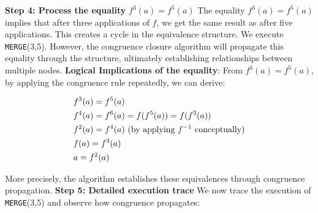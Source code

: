 \documentclass[a4paper]{article}
\theoremstyle{definition}
\begin{document}
\textbf{Step 4: Process the equality} \( f^3(a) = f^5(a) \)   
\vspace{1em}
\noindent
\newline
The equality \( f^3(a) = f^5(a) \) implies that after three applications of \( f \), we get the same result as after 
five applications. This creates a cycle in the equivalence structure.
\vspace{1em}
\noindent
\newline
We execute \texttt{MERGE}(3,5). However, the congruence closure algorithm will propagate this equality through the structure,
ultimately establishing relationships between multiple nodes.
\vspace{1em}
\noindent
\newline
\textbf{Logical Implications of the equality}:
\vspace{1em}
\noindent
\newline
From \( f^3(a) = f^5(a) \), by applying the congruence rule repeatedly, we can derive:
\begin{center}
	\begin{align*}
		& f^3(a) = f^5(a) \\
		& f^4(a) = f^6(a) = f(f^5(a)) = f(f^3(a)) \\
		& f^2(a) = f^4(a) \text{ (by applying \( f^{-1 } \) conceptually)}\\
		& f(a) = f^3(a) \\
		& a = f^2(a) 
	\end{align*}
\end{center}
More precisely, the algorithm establishes these equivalences through congruence propagation.
\vspace{1em}
\noindent
\newline
\textbf{Step 5: Detailed execution trace}
\vspace{1em}
\noindent
\newline
We now trace the execution of \texttt{MERGE}(3,5) and observe how congruence propagates:
\end{document}
